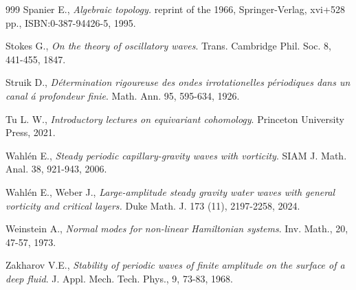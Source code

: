 \documentclass[11pt,a4paper,reqno]{article}
\numberwithin{equation}{section}
\theoremstyle{definition}
\begin{document}
\begin{footnotesize}
\begin{thebibliography}{999}
		Spanier E., {\it Algebraic topology.} %
        reprint of the 1966, %
        Springer-Verlag, %
        xvi+528 pp., ISBN:0-387-94426-5, 1995.


  

		Stokes G., {\it On the theory of oscillatory waves}. Trans. Cambridge Phil. Soc. 8, 441-455, 1847.
  
		Struik D.,  {\it D\'etermination rigoureuse des ondes irrotationelles p\'eriodiques dans un canal \'a profondeur finie}.  Math. Ann. 95, 595-634, 1926.



 Tu L. W., {\it Introductory lectures on equivariant cohomology}. Princeton University Press, 2021.


    Wahl\'en E., {\it Steady periodic capillary-gravity waves with vorticity}. SIAM J. Math. Anal. 38, 921-943, 2006.
 



	Wahl\'en E.,  Weber J., {\it Large-amplitude steady gravity water waves with general vorticity and critical layers.} Duke Math. J. 173 (11), 2197-2258, 2024. 


    Weinstein A., {\it Normal modes for non-linear Hamiltonian systems}. Inv. Math., 20, 47-57, 1973. 


	Zakharov V.E., \emph{Stability of periodic waves of finite amplitude on the surface of a deep fluid}. J. Appl. Mech. Tech. Phys., 9, 73-83, 1968.


\end{thebibliography}
\end{footnotesize}
\end{document}
